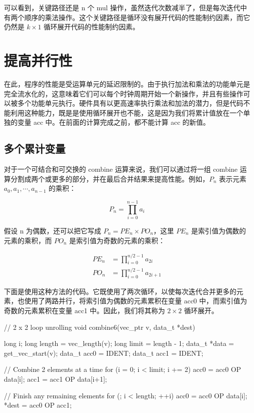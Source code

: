 可以看到，关键路径还是 n 个 mul 操作，虽然迭代次数减半了，但是每次迭代中有两个顺序的乘法操作。这个关键路径是循环没有展开代码的性能制约因素，而它仍然是 $k \times 1$ 循环展开代码的性能制约因素。

\section{提高并行性}

在此，程序的性能是受运算单元的延迟限制的。由于执行加法和乘法的功能单元是完全流水化的，这意味着它们可以每个时钟周期开始一个新操作，并且有些操作可以被多个功能单元执行。硬件具有以更高速率执行乘法和加法的潜力，但是代码不能利用这种能力，既是是使用循环展开也不能，这是因为我们将累计值放在一个单独的变量 acc 中。在前面的计算完成之前，都不能计算 acc 的新值。

\subsection{多个累计变量}

对于一个可结合和可交换的 combine 运算来说，我们可以通过将一组 combine 运算分割成两个或更多的部分，并在最后合并结果来提高性能。例如，$P_n$ 表示元素 $a_0, a_1, \cdots, a_{n-1}$ 的乘积：

\[
    P_n = \prod_{i=0}^{n-1} a_i
\]

假设 n 为偶数，还可以把它写成 $P_n = PE_n \times PO_n$，这里 $PE_n$ 是索引值为偶数的元素的乘积，而 $PO_n$ 是索引值为奇数的元素的乘积：

\begin{align*}
    PE_n & = \prod_{i=0}^{n/2-1} a_{2i} \\
    PO_n & = \prod_{i=0}^{n/2-1} a_{2i+1}
\end{align*}

下面是使用这种方法的代码。它既使用了两次循环，以使每次迭代合并更多的元素，也使用了两路并行，将索引值为偶数的元素累积在变量 acc0 中，而索引值为奇数的元素累积在变量 acc1 中。因此，我们将其称为 $2 \times 2$ 循环展开。

\begin{cppcode}
// 2 x 2 loop unrolling
void combine6(vec_ptr v, data_t *dest) {
  long i;
  long length = vec_length(v);
  long limit = length - 1;
  data_t *data = get_vec_start(v);
  data_t acc0 = IDENT;
  data_t acc1 = IDENT;

  // Combine 2 elements at a time
  for (i = 0; i < limit; i += 2) {
    acc0 = acc0 OP data[i];
    acc1 = acc1 OP data[i+1];
  }

  // Finish any remaining elements
  for (; i < length; ++i) {
    acc0 = acc0 OP data[i];
  }
  *dest = acc0 OP acc1;
}
\end{cppcode}


